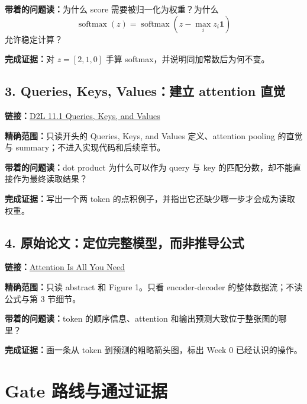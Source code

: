 \documentclass[11pt,a4paper]{article}
\begin{document}
\textbf{带着的问题读：}为什么 score 需要被归一化为权重？为什么
\[
\operatorname{softmax}(z)=\operatorname{softmax}(z-\max_i z_i\mathbf{1})
\]
允许稳定计算？

\textbf{完成证据：}对 $z=[2,1,0]$ 手算 softmax，并说明同加常数后为何不变。

\subsection{3. Queries, Keys, Values：建立 attention 直觉}
\textbf{链接：}\href{https://d2l.ai/chapter_attention-mechanisms-and-transformers/queries-keys-values.html}{D2L 11.1 Queries, Keys, and Values}

\textbf{精确范围：}只读开头的 Queries, Keys, and Values 定义、attention pooling 的直觉与 summary；不进入实现代码和后续章节。

\textbf{带着的问题读：}dot product 为什么可以作为 query 与 key 的匹配分数，却不能直接作为最终读取结果？

\textbf{完成证据：}写出一个两 token 的点积例子，并指出它还缺少哪一步才会成为读取权重。

\subsection{4. 原始论文：定位完整模型，而非推导公式}
\textbf{链接：}\href{https://arxiv.org/abs/1706.03762}{Attention Is All You Need}

\textbf{精确范围：}只读 abstract 和 Figure 1。只看 encoder-decoder 的整体数据流；不读公式与第 3 节细节。

\textbf{带着的问题读：}token 的顺序信息、attention 和输出预测大致位于整张图的哪里？

\textbf{完成证据：}画一条从 token 到预测的粗略箭头图，标出 Week 0 已经认识的操作。

\section{Gate 路线与通过证据}

\begingroup
\small
\setlength{\parskip}{0.2em}
\titlespacing*{\subsection}{0pt}{0.45em}{0.15em}


\end{document}
